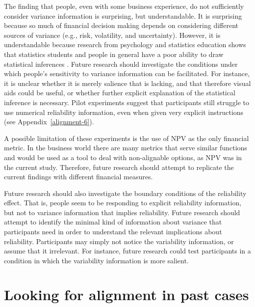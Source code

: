 \documentclass[a4paper, nobind, dvipsnames]{templates/ociamthesis}
\theoremstyle{definition}
\theoremstyle{definition}
\theoremstyle{definition}
\theoremstyle{definition}
\theoremstyle{remark}
\begin{document}
The finding that people, even with some business experience, do not sufficiently
consider variance information is surprising, but understandable. It is
surprising because so much of financial decision making depends on considering
different sources of variance (e.g., risk, volatility, and uncertainty).
However, it is understandable because research from psychology and statistics
education shows that statistics students and people in general have a poor
ability to draw statistical inferences \autocites[e.g.,][]{galesic2010,konold1993}. Future
research should investigate the conditions under which people's sensitivity to
variance information can be facilitated. For instance, it is unclear whether it
is merely salience that is lacking, and that therefore visual aids could be
useful, or whether further explicit explanation of the statistical inference is
necessary. Pilot experiments suggest that participants still struggle to use
numerical reliability information, even when given very explicit instructions
(see Appendix~\ref{alignment-6}).

A possible limitation of these experiments is the use of NPV as the only
financial metric. In the business world there are many metrics that serve
similar functions and would be used as a tool to deal with non-alignable
options, as NPV was in the current study. Therefore, future research should
attempt to replicate the current findings with different financial measures.

Future research should also investigate the boundary conditions of the
reliability effect. That is, people seem to be responding to explicit
reliability information, but not to variance information that implies
reliability. Future research should attempt to identify the minimal kind of
information about variance that participants need in order to understand the
relevant implications about reliability. Participants may simply not notice the
variability information, or assume that it irrelevant. For instance, future
research could test participants in a condition in which the variability
information is more salient.

\newpage

\printbibliography[segment=\therefsegment,heading=subbibintoc]

\hypertarget{interstitial-2}{%
\chapter{Looking for alignment in past cases}\label{interstitial-2}}
\end{document}
